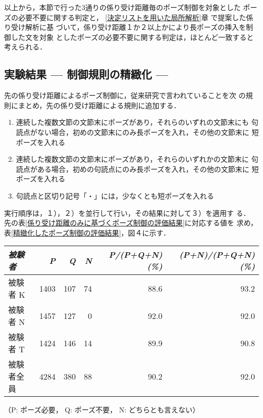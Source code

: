 以上から，本節で行った3通りの係り受け距離毎のポーズ制御を対象とした
ポーズの必要不要に関する判定と，
\ref{決定リストを用いた局所解析}章 で提案した係り受け解析に基
づいて，係り受け距離１か２以上かにより長ポーズの挿入を制御した文を対象
としたポーズの必要不要に関する判定は，ほとんど一致すると考えられる．

\subsection{実験結果 — 制御規則の精緻化 —}
\label{実験結果 — 制御規則の精緻化 —}

   先の係り受け距離によるポーズ制御に，従来研究で言われていることを次
   の規則にまとめ，先の係り受け距離による規則に追加する．
   \begin{enumerate}
    \item 連続した複数文節の文節末にポーズがあり，それらのいずれの文節末にも
	句読点がない場合，初めの文節末にのみ長ポーズを入れ，その他の文節末に
	短ポーズを入れる

    \item 連続した複数文節の文節末にポーズがあり，それらのいずれかの文節末に
	句読点がある場合，初めの句読点にのみ長ポーズを入れ，その他の文節末に
	短ポーズを入れる

    \item 句読点と区切り記号「・」には，少なくとも短ポーズを入れる
   \end{enumerate}
   実行順序は，１），２）を並行して行い，その結果に対して３）を適用す
   る．\\
   先の表\ref{係り受け距離のみに基づくポーズ制御の評価結果}に対応する値を
   求め，表\ref{精緻化したポーズ制御の評価結果}，図４に示す．

\begin{table*}
\caption{精緻化したポーズ制御の評価結果}
\label{精緻化したポーズ制御の評価結果}
\begin{center}
\begin{tabular}{lrrrrr} \hline
	{\it 被験者} &	{\it P} & {\it Q} & {\it N} & {\it
	P/(P+Q+N) (\%)} & {\it (P+N)/(P+Q+N) (\%)} \\ \hline
   被験者 K   & 1403 &  107 &   74 &   88.6 &    93.2\\
   被験者 N   & 1457 &  127 &    0 &   92.0 & 	92.0\\
   被験者 T   & 1424 &  146 &   14 &   89.9 & 	90.8\\
   被験者全員 & 4284 &  380 &	88 &   90.2 & 	92.0\\ \hline
\end{tabular}
\end{center}
\begin{center}
    （P: ポーズ必要， Q: ポーズ不要， N: どちらとも言えない）\\
\end{center}
\end{table*}


